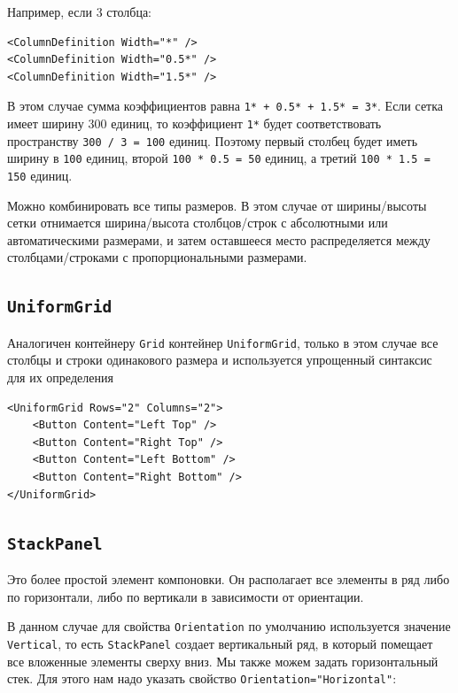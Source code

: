 Например, если 3 столбца:

\begin{verbatim}
<ColumnDefinition Width="*" />
<ColumnDefinition Width="0.5*" />
<ColumnDefinition Width="1.5*" />
\end{verbatim}


В этом случае сумма коэффициентов равна \texttt{1* + 0.5* + 1.5* = 3*}. Если сетка имеет ширину 300 единиц, то коэффициент \texttt{1*} будет соответствовать пространству \texttt{300 / 3 = 100} единиц. Поэтому первый столбец будет иметь ширину в \texttt{100} единиц, второй \texttt{100 * 0.5 = 50} единиц, а третий \texttt{100 * 1.5 = 150} единиц.

Можно комбинировать все типы размеров. В этом случае от ширины/высоты сетки отнимается ширина/высота столбцов/строк с абсолютными или автоматическими размерами, и затем оставшееся место распределяется между столбцами/строками с пропорциональными размерами.

\subsection{\texttt{UniformGrid}}

Аналогичен контейнеру \texttt{Grid} контейнер \texttt{UniformGrid}, только в этом случае все столбцы и строки одинакового размера и используется упрощенный синтаксис для их определения

\begin{verbatim}
<UniformGrid Rows="2" Columns="2">
    <Button Content="Left Top" />
    <Button Content="Right Top" />
    <Button Content="Left Bottom" />
    <Button Content="Right Bottom" />
</UniformGrid>
\end{verbatim}

\subsection{\texttt{StackPanel}}

Это более простой элемент компоновки. Он располагает все элементы в ряд либо по горизонтали, либо по вертикали в зависимости от ориентации.

В данном случае для свойства \texttt{Orientation} по умолчанию используется значение \texttt{Vertical}, то есть \texttt{StackPanel} создает вертикальный ряд, в который помещает все вложенные элементы сверху вниз. Мы также можем задать горизонтальный стек. Для этого нам надо указать свойство \texttt{Orientation="Horizontal"}:

